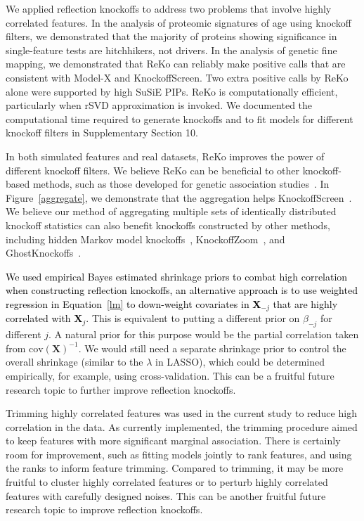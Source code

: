 \documentclass[12pt,Times]{article}
\def\cite{\citep}
\def\tcb{\textcolor{black}}
\def\X{{\mathbf{X}}}
\def\cov{{\textrm{cov}}}
\begin{document}
We applied reflection knockoffs to address two problems that involve highly correlated features. 
In the analysis of proteomic signatures of age using knockoff filters, we demonstrated that the majority of proteins showing significance in single-feature tests are hitchhikers, not drivers.  In the analysis of genetic fine mapping, we demonstrated that ReKo can reliably make positive calls that are consistent with Model-X and KnockoffScreen. Two extra positive calls by ReKo alone were supported by high SuSiE PIPs.  ReKo is computationally efficient, particularly when rSVD approximation is invoked. We documented the computational time required to generate knockoffs and to fit models for different knockoff filters in Supplementary Section 10. 

In both simulated features and real datasets, ReKo improves the power of different knockoff filters. We believe ReKo can be beneficial to other knockoff-based methods, such as those developed for genetic association studies~\cite{candes.etal.18,he.etal.21}.  In Figure~\ref{aggregate}, we demonstrate that the aggregation helps KnockoffScreen~\cite{koscreen}.  We believe our method of aggregating multiple sets of identically distributed
knockoff statistics can also benefit knockoffs constructed by other methods, including hidden Markov model knockoffs~\cite{sesia.etal.19}, KnockoffZoom~\cite{sesia.etal.20}, and GhostKnockoffs~\cite{ghost.knockoff}.  

\tcb{We used empirical Bayes estimated shrinkage priors to combat high correlation when constructing reflection knockoffs, an alternative approach is to use weighted regression in Equation~\eqref{lm} to down-weight covariates in $\X_{-j}$ that are highly correlated with $\X_j$.} This is equivalent to putting a different prior on $\beta_{-j}$ for different $j$. A natural prior for this purpose would be the partial correlation taken from $\cov(\X)^{-1}$. We would still need a separate shrinkage prior to control the overall shrinkage (similar to the $\lambda$ in LASSO), which could be determined empirically, for example, using cross-validation. This can be a fruitful future research topic to further improve reflection knockoffs.   

Trimming highly correlated features was used in the current study to reduce high correlation in the data. As currently implemented, the trimming procedure aimed to keep features with more significant marginal association. There is certainly room for improvement, such as fitting models jointly to rank features, and using the ranks to inform feature trimming.  Compared to trimming, it may be more fruitful to cluster highly correlated features or to perturb highly correlated features with carefully designed noises.  This can be another fruitful future research topic to improve reflection knockoffs.   
\end{document}
